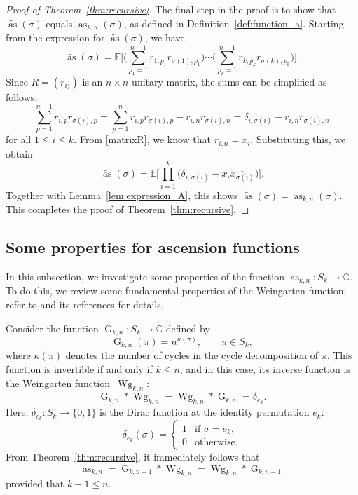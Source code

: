 \documentclass[10pt,a4paper]{amsart}
\numberwithin{equation}{section}
\theoremstyle{definition}
\DeclareMathOperator{\Raise}{as}
\DeclareMathOperator{\G}{G}
\DeclareMathOperator{\Wg}{Wg}
\begin{document}
\begin{proof}[Proof of Theorem~\ref{thm:recursive}]
The final step in the proof is to show that $\widetilde{\Raise}(\sigma)$ equals $\Raise_{k,n}(\sigma)$, as defined in Definition~\ref{def:function_a}.
Starting from the expression for $\widetilde{\Raise}(\sigma)$, we have
\[
\widetilde{\Raise}(\sigma)
= \mathbb{E} \Biggl[
\Biggl(\sum_{p_1=1}^{n-1} r_{1,p_1}\overline{r_{\sigma(1),p_1}} \Biggr)
\cdots
\Biggl(\sum_{p_k=1}^{n-1} r_{k,p_k}\overline{r_{\sigma(k),p_k}} \Biggr)
\Biggr].
\]
Since $R=(r_{ij})$ is an $n \times n$ unitary matrix,
the sums can be simplified as follows:
\[
\sum_{p=1}^{n-1} r_{i,p}\overline{r_{\sigma(i),p}} =
\sum_{p=1}^{n} r_{i,p}\overline{r_{\sigma(i),p}} -r_{i,n} \overline{r_{\sigma(i),n}}
= \delta_{i,\sigma(i)}-r_{i,n} \overline{r_{\sigma(i),n}}
\]
for all $1 \le i \le k$.
From \eqref{matrixR}, we know that $r_{i,n}=x_i$.
Substituting this, we obtain
\[
\widetilde{\Raise}(\sigma)= \mathbb{E} \Biggl[ \prod_{i=1}^k \big(\delta_{i,\sigma(i)}-x_{i} \overline{x_{\sigma(i)}}\big) \Biggr].
\]
Together with Lemma~\ref{lem:expression_A}, this shows $\widetilde{\Raise}(\sigma)=\Raise_{k,n}(\sigma)$.
This completes the proof of Theorem~\ref{thm:recursive}.
\end{proof}


\subsection{Some properties for ascension functions}

In this subsection, we investigate some properties of the function $\Raise_{k,n}\colon S_k \to \mathbb{C}$.
To do this, we review some fundamental properties of the Weingarten function;
refer to \cite{CMN} and its references for details.

Consider the function $\G_{k,n}\colon S_k \to \mathbb{C}$ defined by
\[
\G_{k,n}(\pi)= n^{\kappa(\pi)}, \qquad \pi \in S_k,
\]
where $\kappa(\pi)$ denotes the number of cycles in the cycle decomposition of $\pi$.
This function is invertible if and only if $k \le n$, and in this case,
its inverse function is the Weingarten function~$\Wg_{k,n}$:
\[
\G_{k,n} * \Wg_{k,n} = \Wg_{k,n} *\G_{k,n} =\delta_{e_k}.
\]
Here, $\delta_{e_k}\colon S_k \to \{0,1\}$ is the Dirac function at the identity permutation $e_k$:
\[
\delta_{e_k}( \sigma)= \begin{cases}
1 & \text{if $\sigma=e_k$}, \\
0 & \text{otherwise}.
\end{cases}
\]
From Theorem~\ref{thm:recursive}, it immediately follows that
\begin{equation} \label{eq:as_g_Wg}
 \Raise_{k,n} = \G_{k,n-1} * \Wg_{k,n} = \Wg_{k,n} * \G_{k,n-1}
\end{equation}
provided that $k +1 \le n$.
\end{document}
